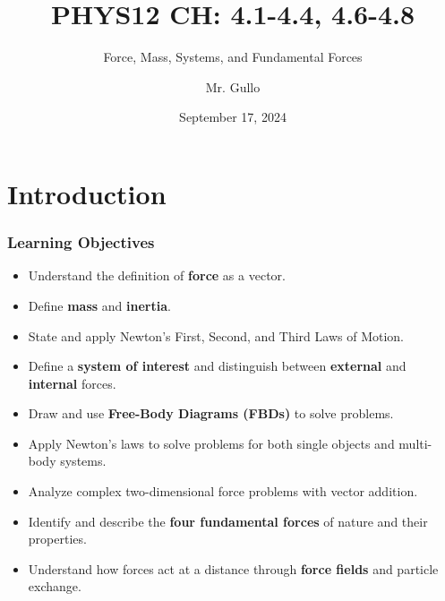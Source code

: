 \documentclass{beamer}
\title[Newton's Laws and Systems]{PHYS12 CH: 4.1-4.4, 4.6-4.8}
\subtitle{Force, Mass, Systems, and Fundamental Forces}
\author[Mr. Gullo]{Mr. Gullo}
\date[Sep 2024]{September 17, 2024}
\begin{document}
\frame{\titlepage}

\section{Introduction}

\begin{frame}
\frametitle{Learning Objectives}
\begin{itemize}
    \item Understand the definition of \textbf{force} as a vector. \pause
    \item Define \textbf{mass} and \textbf{inertia}. \pause
    \item State and apply Newton's First, Second, and Third Laws of Motion. \pause
    \item Define a \textbf{system of interest} and distinguish between \textbf{external} and \textbf{internal} forces. \pause
    \item Draw and use \textbf{Free-Body Diagrams (FBDs)} to solve problems. \pause
    \item Apply Newton's laws to solve problems for both single objects and multi-body systems. \pause
    \item Analyze complex two-dimensional force problems with vector addition. \pause
    \item Identify and describe the \textbf{four fundamental forces} of nature and their properties. \pause
    \item Understand how forces act at a distance through \textbf{force fields} and particle exchange.
\end{itemize}
\end{frame}
\end{document}
